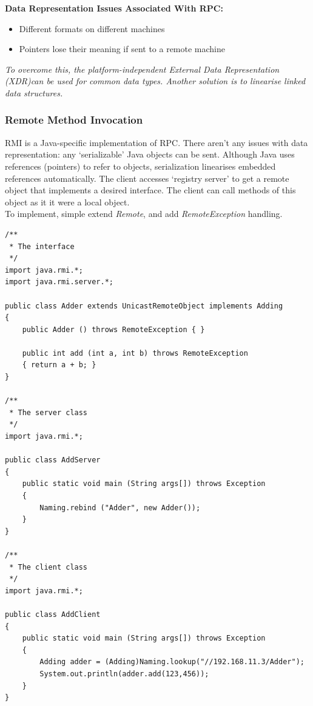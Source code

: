 \documentclass[a4paper,oneside]{report}
\begin{document}
		\noindent \textbf{Data Representation Issues Associated With RPC:}
		\begin{itemize}
			\item Different formats on different machines
			\item Pointers lose their meaning if sent to a remote machine
		\end{itemize}
		
		\emph{To overcome this, the platform-independent External Data Representation (XDR)can be used for common data types. Another solution is to linearise linked data structures.}
  	
  		\subsubsection{Remote Method Invocation}
  		RMI is a Java-specific implementation of RPC. There aren't any issues with data representation: any `serializable' Java objects can be sent. Although Java uses references (pointers) to refer to objects, serialization linearises embedded references automatically. The client accesses `registry server' to get a remote object that implements a desired interface. The client can call methods of this object as it it were a local object.\\
  		
  		\noindent To implement, simple extend \emph{Remote}, and add \emph{RemoteException} handling.
  		
\begin{lstlisting}[label=some-code,caption=Implementing RMI] 
/**
 * The interface
 */
import java.rmi.*;
import java.rmi.server.*;
   
public class Adder extends UnicastRemoteObject implements Adding 
{
    public Adder () throws RemoteException { }
    		
  	public int add (int a, int b) throws RemoteException
	{ return a + b; }
}
  			
/**
 * The server class
 */
import java.rmi.*; 
  		
public class AddServer 
{
	public static void main (String args[]) throws Exception 
	{
		Naming.rebind ("Adder", new Adder()); 
	}
}

/**
 * The client class
 */	
import java.rmi.*;

public class AddClient 
{
    public static void main (String args[]) throws Exception 
	{
      	Adding adder = (Adding)Naming.lookup("//192.168.11.3/Adder");
		System.out.println(adder.add(123,456));
	}
}
\end{lstlisting}
  	
\end{document}
